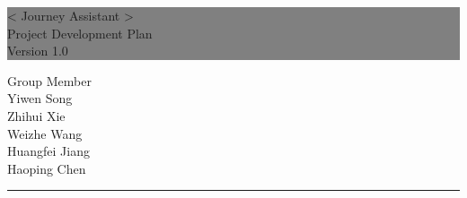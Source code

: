 \documentclass[10pt]{article}
\begin{document}

\begin{titlepage} %
	
	
	\colorbox{grey}{
		\parbox[t]{1.1\textwidth}{ %
			\parbox[t]{1.02\textwidth}{ %
				\raggedleft %
				\fontsize{34pt}{40pt}\selectfont %
				\vspace{0.7cm} %
				
				< Journey Assistant >\\
                Project Development Plan\\
                Version 1.0\\
				
				\vspace{0.7cm} %
			}
		}
	}
	
	\vfill %
	
	
	\parbox[t]{1\textwidth}{ %
		\raggedleft %
		\large %
		{\Large Group Member}\\[4pt] %
        Yiwen Song\\
        Zhihui Xie\\
        Weizhe Wang\\
        Huangfei Jiang\\
        Haoping Chen\\
		
		\hfill\rule{0.2\linewidth}{1pt}%
    }
    
	
\end{titlepage}
\end{document}
